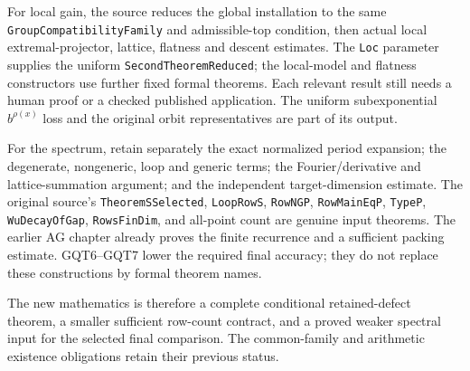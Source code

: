 For local gain, the source reduces the global installation to
the same \texttt{GroupCompatibility\allowbreak{}Family} and admissible-top
condition, then actual local extremal-projector, lattice, flatness
and descent estimates. The \texttt{Loc} parameter supplies the
uniform \texttt{SecondTheoremReduced}; the local-model and
flatness constructors use further fixed formal theorems. Each
relevant result still needs a human proof or a checked published
application. The uniform subexponential
$b^{\rho(x)}$ loss and the original orbit representatives are
part of its output.

For the spectrum, retain separately the exact normalized period
expansion; the degenerate, nongeneric, loop and generic terms;
the Fourier/derivative and lattice-summation argument; and the
independent target-dimension estimate. The original source's
\texttt{TheoremSSelected}, \texttt{LoopRowS},
\texttt{RowNGP}, \texttt{RowMainEqP}, \texttt{TypeP},
\texttt{WuDecayOfGap}, \texttt{RowsFinDim}, and all-point count
are genuine input theorems. The earlier AG chapter already
proves the finite recurrence and a sufficient packing estimate.
GQT6--GQT7 lower the required final accuracy; they do not replace
these constructions by formal theorem names.

The new mathematics is therefore a complete conditional
retained-defect theorem, a smaller sufficient row-count contract,
and a proved weaker spectral input for the selected final
comparison. The common-family and arithmetic existence
obligations retain their previous status.
